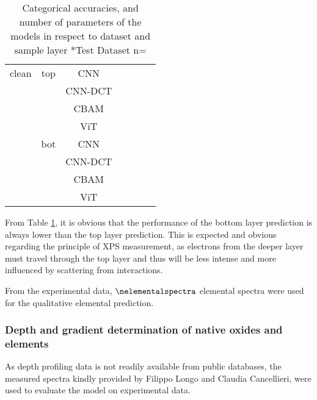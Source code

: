 \begin{table}[H]
{\begin{tabular}{c|c|c|c|c|c|c}
        \hline                                   
        clean   & top   & CNN     &                &               &                &            \\
                &       & CNN-DCT &                &               &                &            \\
                &       & CBAM    &                &               &                &            \\
                &       & ViT     &                &               &                &            \\
                & bot   & CNN     &                &               &                &             \\
                &       & CNN-DCT &                &               &                &             \\
                &       & CBAM    &                &               &                &            \\
                &       & ViT     &                &               &                &            \\
    \end{tabular}}
    \caption{Categorical accuracies, and number of parameters of the models in respect to dataset and sample layer
    *Test Dataset n=\nelementalspectra}
    \label{tab:acc_qual}
\end{table}

From Table \ref{tab:acc_qual}, it is obvious that the performance of the bottom layer prediction is always lower than the top layer prediction. This is expected and obvious regarding the principle of XPS measurement, as electrons from the deeper layer must travel through the top layer and thus will be less intense and more influenced by scattering from interactions.

From the experimental data, $\nelementalspectra$ elemental spectra were used for the qualitative elemental prediction. 

\subsubsection{Depth and gradient determination of native oxides and elements}
As depth profiling data is not readily available from public databases, the measured spectra kindly provided by Filippo Longo and Claudia Cancellieri, were used to evaluate the model on experimental data.


